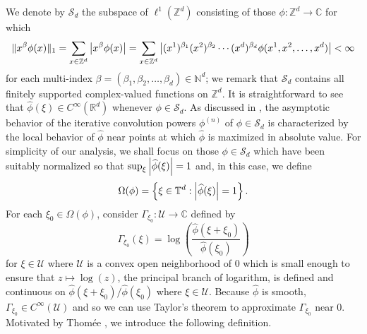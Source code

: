 \documentclass[11pt]{article}
\begin{document}
We denote by $\mathcal{S}_d$ the subspace of $\ell^1(\mathbb{Z}^d)$ consisting of those $\phi:\mathbb{Z}^d\to\mathbb{C}$ for which
\begin{equation*}
    \|x^\beta \phi(x)\|_1=\sum_{x\in\mathbb{Z}^d}\abs{x^\beta\phi(x)}=\sum_{x\in\mathbb{Z}^d}\abs{(x^1)^{\beta_1}(x^2)^{\beta_2}\cdots(x^d)^{\beta_d}\phi(x^1,x^2,\dots,x^d)}<\infty
\end{equation*}
for each multi-index $\beta=(\beta_1,\beta_2,\dots,\beta_d)\in\mathbb{N}^d$; we remark that $\mathcal{S}_d$ contains all finitely supported complex-valued functions on $\mathbb{Z}^d$. It is straightforward to see that $\widehat{\phi}(\xi)\in C^\infty(\mathbb{R}^d)$ whenever $\phi\in \mathcal{S}_d$. As discussed in \cite{Thomee1965,DSC2014,Randles2015,Randles2017}, the asymptotic behavior of the iterative convolution powers $\phi^{(n)}$ of $\phi\in\mathcal{S}_d$ is characterized by the local behavior of $\widehat{\phi}$ near points at which $\widehat{\phi}$ is maximized in absolute value. For simplicity of our analysis, we shall focus on those $\phi\in\mathcal{S}_d$ which have been suitably normalized so that $\sup_{\xi}\abs{\widehat{\phi}(\xi)}=1$ and, in this case, we define
\begin{equation*}
    \Omega(\phi)=\left\{\xi\in \mathbb{T}^d:\abs{\widehat{\phi}(\xi)}=1\right\}.
\end{equation*}
For each $\xi_0\in \Omega(\phi)$, consider $\Gamma_{\xi_0}:\mathcal{U}\to\mathbb{C}$ defined by
\begin{equation*}\Gamma_{\xi_0}(\xi)=\log\left(\frac{\widehat{\phi}(\xi+\xi_0)}{\widehat{\phi}(\xi_0)}\right)
\end{equation*}
for $\xi\in \mathcal{U}$ where $\mathcal{U}$ is a convex open neighborhood of $0$ which is small enough to ensure that $z\mapsto\log(z)$, the principal branch of logarithm, is defined and continuous on $\widehat{\phi}(\xi+\xi_0)/\widehat{\phi}(\xi_0)$ where $\xi\in\mathcal{U}$. Because $\widehat{\phi}$ is smooth, $\Gamma_{\xi_0}\in C^{\infty}(\mathcal{U})$ and so we can use Taylor's theorem to approximate $\Gamma_{\xi_0}$ near $0$. Motivated by Thom\'{e}e \cite{Thomee1965}, we introduce the following definition. 
\end{document}
